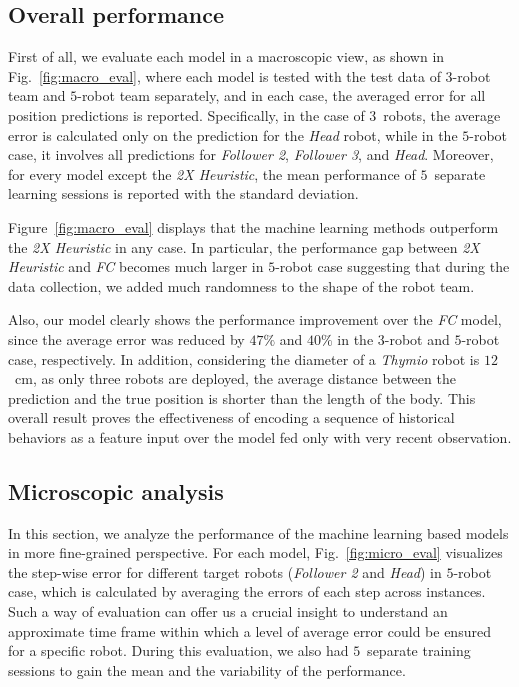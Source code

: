 \documentclass[letterpaper, 10 pt, conference]{ieeeconf}  %
\begin{document}
	
	\subsection{Overall performance}
	\label{sec:overall_performance}
	
	First of all, we evaluate each model in a macroscopic view, as shown in 	
	Fig.~\ref{fig:macro_eval}, where each model is tested with the 
	test data of $3$-robot team and $5$-robot team separately, and in each case, 
	the averaged error for all position predictions is reported. 
	Specifically, in the case of $3$~robots, the average error is calculated only on 
	the prediction for the \emph{Head} robot, while in the $5$-robot case, 
	it involves all predictions for \emph{Follower 2}, \emph{Follower 3}, and \emph{Head}.  
	Moreover, for every model except the \emph{2X Heuristic}, the mean performance of 
	$5$~separate learning sessions is reported with the standard deviation. 
	
	Figure~\ref{fig:macro_eval} displays that the machine learning methods outperform 
	the \emph{2X Heuristic} in any case. In particular, the performance gap between 
	\emph{2X Heuristic} and \emph{FC} becomes much larger in $5$-robot case suggesting that
	during the data collection, we added much randomness to the shape of the robot team.  
	
	Also, our model clearly shows the performance improvement over the \emph{FC} model, since 
	the average error was reduced by $47\%$ and $40\%$ in the $3$-robot and $5$-robot case, 
	respectively. In addition, considering the diameter of a \emph{Thymio} robot is 
	$12$~cm, as only three robots are deployed, the average distance between the prediction 
	and the true position is shorter than the length of the body. This overall result proves 
	the effectiveness of encoding a sequence of historical behaviors as a feature input
	over the model fed only with very recent observation.  

	
	\subsection{Microscopic analysis}
	\label{sec:microscopic_analysis}
	
	In this section, we analyze the performance of the machine learning based models 
	in more fine-grained perspective. For each model, Fig.~\ref{fig:micro_eval} visualizes the 
	step-wise error for different target robots (\emph{Follower 2} and \emph{Head}) 
	in $5$-robot case, which is calculated by averaging the errors of each step across instances. 
	Such a way of evaluation can offer us a crucial insight to understand an approximate time frame 
	within which a level of average error could be ensured for a specific robot. During this 
	evaluation, we also had $5$~separate training sessions to gain the mean and the variability 
	of the performance. 
	
\end{document}
